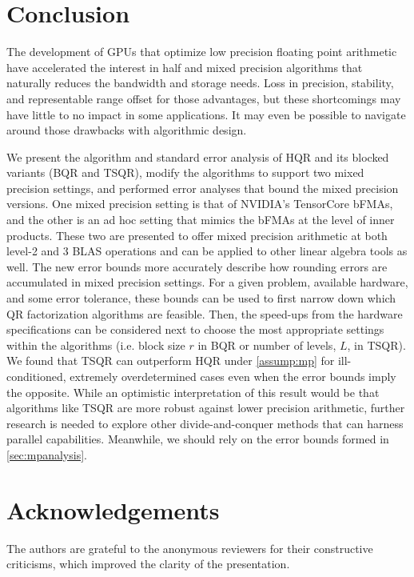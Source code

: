 \documentclass[review,onefignum,onetabnum]{siamart190516}
\begin{document}
\section{Conclusion}
The development of GPUs that optimize low precision floating point arithmetic have accelerated the interest in half and mixed precision algorithms that naturally reduces the bandwidth and storage needs. 
Loss in precision, stability, and representable range offset for those advantages, but these shortcomings may have little to no impact in some applications.
It may even be possible to navigate around those drawbacks with algorithmic design. \par
We present the algorithm and standard error analysis of HQR and its blocked variants (BQR and TSQR), modify the algorithms to support two mixed precision settings, and performed error analyses that bound the mixed precision versions.
One mixed precision setting is that of NVIDIA's TensorCore bFMAs, and the other is an ad hoc setting that mimics the bFMAs at the level of inner products.
These two are presented to offer mixed precision arithmetic at both level-2 and 3 BLAS operations and can be applied to other linear algebra tools as well.
The new error bounds more accurately describe how rounding errors are accumulated in mixed precision settings.
For a given problem, available hardware, and some error tolerance, these bounds can be used to first narrow down which QR factorization algorithms are feasible. 
Then, the speed-ups from the hardware specifications can be considered next to choose the most appropriate settings within the algorithms (i.e. block size $r$ in BQR or number of levels, $L$, in TSQR).
We found that TSQR can outperform HQR under \cref{assump:mp} for ill-conditioned, extremely overdetermined cases even when the error bounds imply the opposite.
While an optimistic interpretation of this result would be that algorithms like TSQR are more robust against lower precision arithmetic, further research is needed to explore other divide-and-conquer methods that can harness parallel capabilities.
Meanwhile, we should rely on the error bounds formed in \cref{sec:mpanalysis}.
\section*{Acknowledgements}
The authors are grateful to the anonymous reviewers for their constructive criticisms, which improved the clarity of the presentation.

\end{document}
